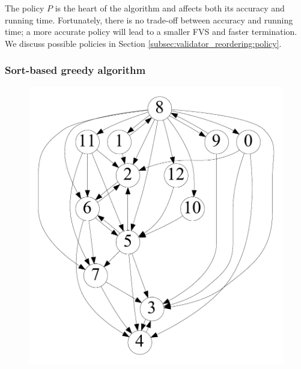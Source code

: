 The policy $P$ is the heart of the algorithm and affects both its accuracy and running time. Fortunately, there is no trade-off between accuracy and running time; a more accurate policy will lead to a smaller FVS and faster termination. We discuss possible policies in Section \ref{subsec:validator_reordering:policy}.



\subsubsection{Sort-based greedy algorithm}



\begin{figure}[t]
    \centering
    \begin{minipage}[b]{0.19\linewidth}
        \captionsetup{type=figure}
        \centering
            {\includegraphics[width=\textwidth]{./alg_fig/scc-g0}}
    \end{minipage}
   	\begin{minipage}[b]{0.19\linewidth}
        \centering

\end{minipage}
\end{figure}
